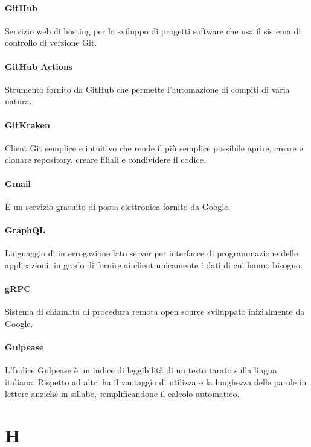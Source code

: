\documentclass[]{article}
\begin{document}
	\paragraph*{GitHub}
	Servizio web di hosting per lo sviluppo di progetti software che usa il sistema di controllo di versione Git.
	
	\paragraph*{GitHub Actions}
	Strumento fornito da GitHub che permette l’automazione di compiti di varia natura.
	
	\paragraph*{GitKraken}
	Client Git semplice e intuitivo che rende il più semplice possibile aprire, creare e clonare repository, creare filiali e condividere il codice.
	
	\paragraph*{Gmail}
	È un servizio gratuito di posta elettronica fornito da Google.
	
	\paragraph*{GraphQL}
	Linguaggio di interrogazione lato server per interfacce di programmazione delle applicazioni, in grado di fornire ai client unicamente i dati di cui hanno bisogno.
	
	\paragraph*{gRPC}
	Sistema di chiamata di procedura remota open source sviluppato inizialmente da Google.
	
	\paragraph*{Gulpease}
	L'Indice Gulpease è un indice di leggibilità di un testo tarato sulla lingua italiana. Rispetto ad altri ha il vantaggio di utilizzare la lunghezza delle parole in lettere anziché in sillabe, semplificandone il calcolo automatico.
	
	\newpage
	
	\section*{H}
	
\end{document}
